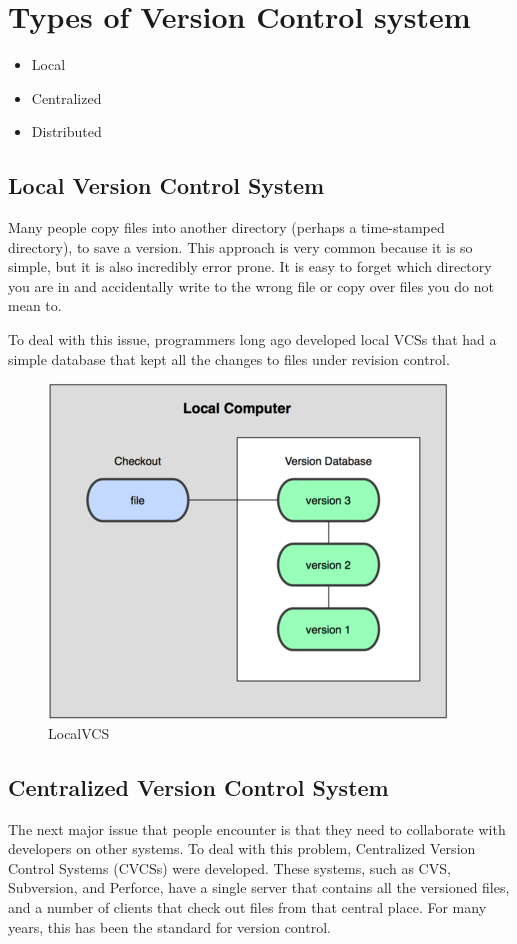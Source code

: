 \documentclass[11pt,a4paper]{article}
\begin{document}
\section*{Types of Version Control system}
\begin{itemize}
\item Local 
\item Centralized 
\item Distributed 
\end{itemize}

\subsection*{Local Version Control System}
 Many people copy files into another directory (perhaps a time-stamped directory), to save a version. This approach is very common because it is so simple, but it is also incredibly error prone. It is easy to forget which directory you are in and accidentally write to the wrong file or copy over files you do not mean to.

To deal with this issue, programmers long ago developed local VCSs that had a simple database that kept all the changes to files under revision control.

\begin{figure}[H]
\begin{center}
\includegraphics[scale=0.5]{LocalVCS.png}
\caption{LocalVCS}
\label{LocalVCS}\end{center}
\end{figure}


\subsection*{Centralized Version Control System}
The next major issue that people encounter is that they need to collaborate with developers on other systems. To deal with this problem, Centralized Version Control Systems (CVCSs) were developed. These systems, such as CVS, Subversion, and Perforce, have a single server that contains all the versioned files, and a number of clients that check out files from that central place. For many years, this has been the standard for version control.
\end{document}
